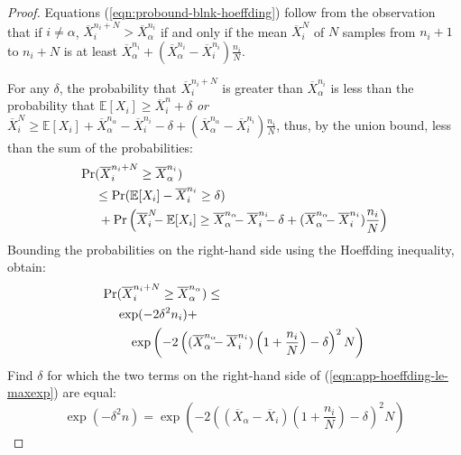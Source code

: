\documentclass[]{article}
\newcommand {\IE} {\ensuremath {\mathbb{E}}}
\begin{document}
\begin{proof}
Equations (\ref{eqn:probound-blnk-hoeffding}) follow from the
observation that if $i\ne\alpha$, $\overline X_i^{n_i+N}>\overline X_\alpha^{n_i}$
if and only if the mean $\overline X_i^N$ of $N$ samples from $n_i+1$
to $n_i+N$ is at least $\overline X_\alpha^{n_i}+(\overline X_\alpha^{n_i}-\overline
X_i^{n_i})\frac {n_i} N$.

For any $\delta$, the probability that $\overline X_i^{n_i+N}$ is greater
than $\overline X_\alpha^{n_i}$ is less than the probability that
$\IE[X_i]\ge\overline X_i^n+\delta$
\emph{or} $\overline X_i^N\ge \IE[X_i]+\overline X_\alpha^{n_\alpha}
- \overline X_i^{n_i} - \delta +(\overline X_\alpha^{n_\alpha} - \overline X_i^{n_i})\frac {n_i} N$,
thus, by the union bound, less than the sum of the probabilities:
\begin{align}
\Pr&(\overline X_i^{n_i+N}\ge \overline X_\alpha^{n_i})\nonumber\\
   &\le\Pr(\IE[X_i]-\overline X_i^{n_i} \ge \delta)\\
   &\hspace{0.25em}+\Pr\left(\overline X_i^N\hspace{-0.5em} - \IE[X_i] \ge \overline X_\alpha^{n_\alpha}\hspace{-0.5em}
           - \overline X_i^{n_i}\hspace{-0.5em} - \delta +(\overline X_\alpha^{n_\alpha}\hspace{-0.5em} - \overline X_i^{n_i})\frac {n_i} N\right)\nonumber
\end{align}
Bounding the probabilities on the right-hand side using the Hoeffding
inequality, obtain:
\begin{align}
\Pr&(\overline X_i^{n_i+N}\ge \overline X_\alpha^{n_\alpha})\le \nonumber\\
    &\exp(-2\delta^2n_i)+\nonumber\\
    &\quad\exp\left(-2\left((\overline X_\alpha^{n_\alpha}\hspace{-0.5em}
         - \overline X_i^{n_i})\left(1+\frac {n_i} N\right)
         - \delta\right)^2N\right)
\label{eqn:app-hoeffding-le-maxexp}
\end{align}
Find $\delta$ for which the two terms on the right-hand side of
(\ref{eqn:app-hoeffding-le-maxexp}) are equal:
\begin{equation}
\exp(-\delta^2n) = \exp\left(-2\left((\overline X_\alpha - \overline X_i)(1+\frac {n_i} N) - \delta\right)^2N\right)\label{eqn:app-hoeffding-eq-exp}
\end{equation}

\end{proof}
\end{document}
